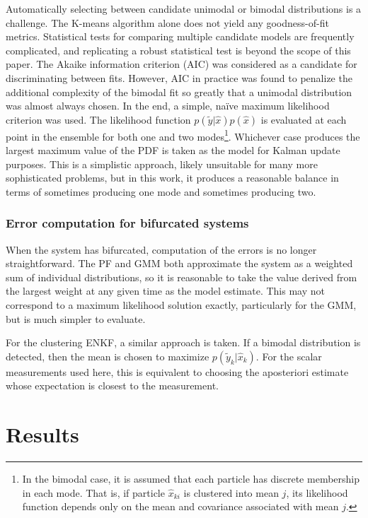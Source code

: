 \documentclass[]{article}
\begin{document}
Automatically selecting between candidate unimodal or bimodal distributions is a challenge. The K-means algorithm alone does not yield any goodness-of-fit metrics. Statistical tests for comparing multiple candidate models are frequently complicated, and replicating a robust statistical test is beyond the scope of this paper. The Akaike information criterion (AIC) was considered as a candidate for discriminating between fits. However, AIC in practice was found to penalize the additional complexity of the bimodal fit so greatly that a unimodal distribution was almost always chosen. In the end, a simple, na\"{i}ve maximum likelihood criterion was used. The likelihood function $p(\tilde{y} | \hat{x})p(\hat{x})$ is evaluated at each point in the ensemble for both one and two modes\footnote{In the bimodal case, it is assumed that each particle has discrete membership in each mode. That is, if particle $\hat{x}_{ki}$ is clustered into mean $j$, its likelihood function depends only on the mean and covariance associated with mean $j$.}. Whichever case produces the largest maximum value of the PDF is taken as the model for Kalman update purposes. This is a simplistic approach, likely unsuitable for many more sophisticated problems, but in this work, it produces a reasonable balance in terms of sometimes producing one mode and sometimes producing two.

\subsubsection{Error computation for bifurcated systems}

When the system has bifurcated, computation of the errors is no longer straightforward. The PF and GMM both approximate the system as a weighted sum of individual distributions, so it is reasonable to take the value derived from the largest weight at any given time as the model estimate. This may not correspond to a maximum likelihood solution exactly, particularly for the GMM, but is much simpler to evaluate.

For the clustering ENKF, a similar approach is taken. If a bimodal distribution is detected, then the mean is chosen to maximize $p(\tilde{y}_k | \hat{x}_k)$. For the scalar measurements used here, this is equivalent to choosing the aposteriori estimate whose expectation is closest to the measurement.

\section{Results}
\end{document}
